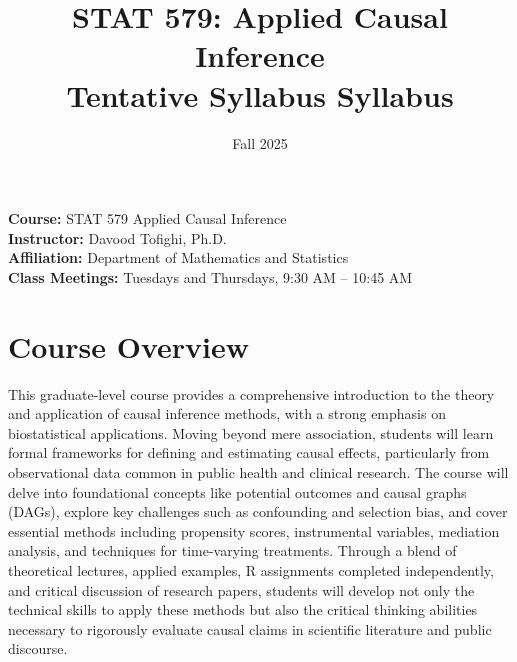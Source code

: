 \documentclass[10.5pt]{article}
\title{STAT 579: Applied Causal Inference \\ \large Tentative Syllabus Syllabus }
\date{Fall 2025}
\begin{document}
\maketitle
\vspace{3em}

\begin{flushleft}
\textbf{Course:} STAT 579 Applied Causal Inference \\
\textbf{Instructor:} Davood Tofighi, Ph.D. \\
\textbf{Affiliation:} Department of Mathematics and Statistics \\
\textbf{Class Meetings:} Tuesdays and Thursdays, 9:30 AM – 10:45 AM\end{flushleft}


\section{Course Overview}

This graduate-level course provides a comprehensive introduction to the theory and application of causal inference methods, with a strong emphasis on biostatistical applications. Moving beyond mere association, students will learn formal frameworks for defining and estimating causal effects, particularly from observational data common in public health and clinical research. The course will delve into foundational concepts like potential outcomes and causal graphs (DAGs), explore key challenges such as confounding and selection bias, and cover essential methods including propensity scores, instrumental variables, mediation analysis, and techniques for time-varying treatments. Through a blend of theoretical lectures, applied examples, R assignments completed independently, and critical discussion of research papers, students will develop not only the technical skills to apply these methods but also the critical thinking abilities necessary to rigorously evaluate causal claims in scientific literature and public discourse.
\end{document}
